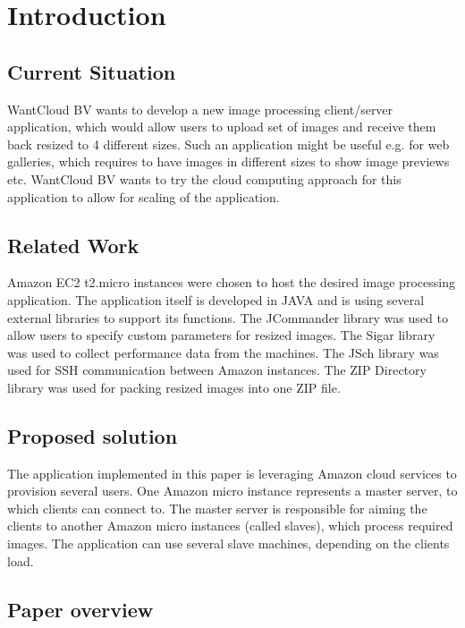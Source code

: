 \section{Introduction}
\subsection{Current Situation} 
WantCloud BV wants to develop a new image processing client/server application, which would allow users to upload set of images and receive them back resized to 4 different sizes. Such an application might be useful e.g. for web galleries, which requires to have images in different sizes to show image previews etc. WantCloud BV wants to try the cloud computing approach for this application to allow for scaling of the application.

\subsection{Related Work} 
Amazon EC2 t2.micro instances were chosen to host the desired image processing application. The application itself is developed in JAVA and is using several external libraries to support its functions. The JCommander library was used to allow users to specify custom parameters for resized images. The Sigar library was used to collect performance data from the machines. The JSch library was used for SSH communication between Amazon instances. The ZIP Directory library was used for packing resized images into one ZIP file.

\subsection{Proposed solution}
The application implemented in this paper is leveraging Amazon cloud services to provision several users. One Amazon micro instance represents a master server, to which clients can connect to. The master server is responsible for aiming the clients to another Amazon micro instances (called slaves), which process required images. The application can use several slave machines, depending on the clients load.

\subsection{Paper overview}